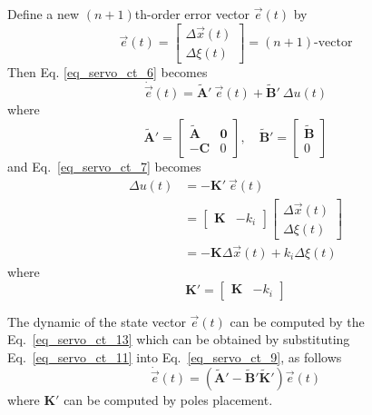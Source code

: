 \documentclass[12pt,a4paper,oneside]{book}
\begin{document}
\begin{onehalfspace}
Define a new $(n+1)$th-order error vector $\vec{e}(t)$ by 
\begin{equation*}\label{eq_servo_ct_8}
	\vec{e}(t)  = 
	\begin{bmatrix}
		\Delta\vec{x}(t) \\[6pt] \Delta\xi(t)
	\end{bmatrix} = (n+1)\text{-vector}
\end{equation*}
Then Eq. \ref{eq_servo_ct_6} becomes
\begin{equation}\label{eq_servo_ct_9}
	\dot{\vec{e}}(t) = \tilde{\mathbf{A}}'\ \vec{e}(t) + \tilde{\mathbf{B}}'\ 
	\Delta u(t)
\end{equation}
where
\begin{equation}\label{eq_servo_ct_10}
	\tilde{\mathbf{A}}'  = 
	\begin{bmatrix}
		\tilde{\mathbf{A}} & \mathbf{0} \\[6pt]
		-{\mathbf{C}} & 0
	\end{bmatrix}, \quad
	\tilde{\mathbf{B}}'  = 
	\begin{bmatrix}
		\tilde{\mathbf{B}} \\[6pt] 0
	\end{bmatrix}
\end{equation}
and Eq.~\eqref{eq_servo_ct_7} becomes
\begin{equation}\label{eq_servo_ct_11}
	\begin{aligned}
		\Delta u(t) &= -{\mathbf{K}}'\ \vec{e}(t) \\[6pt]
		&= \begin{bmatrix}
			{\mathbf{K}} & -k_i
		\end{bmatrix} \begin{bmatrix}
			\Delta\vec{x}(t) \\[6pt] \Delta\xi(t)
		\end{bmatrix}  \\[6pt]
		&= -{\mathbf{K}}\Delta\vec{x}(t) + k_i\Delta\xi(t)
	\end{aligned}
\end{equation}
where
\begin{equation}\label{eq_servo_ct_12}
	{\mathbf{K}}'= \begin{bmatrix}
		{\mathbf{K}} & -k_i
	\end{bmatrix}
\end{equation}

The dynamic of the state vector $\vec{e}(t)$ can be computed by the 
Eq.~\eqref{eq_servo_ct_13} which can be obtained by substituting 
Eq.~\eqref{eq_servo_ct_11} into Eq.~\eqref{eq_servo_ct_9}, as follows
\begin{equation}\label{eq_servo_ct_13}
	\dot{\vec{e}}(t) = \left(\tilde{\mathbf{A}}' - 
	\tilde{\mathbf{B}}'\tilde{\mathbf{K}}'\right)\vec{e}(t)
\end{equation}
where ${\mathbf{K}}'$ can be computed by poles placement.


\end{onehalfspace}
\end{document}

